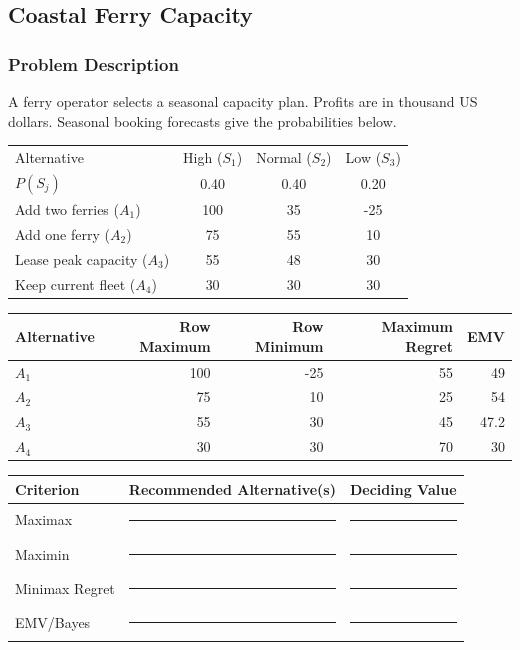\subsection{Coastal Ferry Capacity}\label{sec:c8-ferry}
\subsubsection*{Problem Description}
A ferry operator selects a seasonal capacity plan. Profits are in thousand US dollars. Seasonal booking forecasts give the probabilities below.
\begin{center}
\begin{tabular}{lccc}\toprule
Alternative & High ($S_1$) & Normal ($S_2$) & Low ($S_3$)\\
$P(S_j)$ & 0.40 & 0.40 & 0.20\\\midrule
Add two ferries ($A_1$) & 100 & 35 & -25\\
Add one ferry ($A_2$) & 75 & 55 & 10\\
Lease peak capacity ($A_3$) & 55 & 48 & 30\\
Keep current fleet ($A_4$) & 30 & 30 & 30\\\bottomrule
\end{tabular}
\end{center}
\begin{center}
\begin{tabular}{lrrrr}\toprule
Alternative & Row Maximum & Row Minimum & Maximum Regret & EMV\\\midrule
$A_1$ & 100 & -25 & 55 & 49\\
$A_2$ & 75 & 10 & 25 & 54\\
$A_3$ & 55 & 30 & 45 & 47.2\\
$A_4$ & 30 & 30 & 70 & 30\\\bottomrule
\end{tabular}
\end{center}

\begin{center}
\begin{tabular}{lll}\toprule
Criterion & Recommended Alternative(s) & Deciding Value\\\midrule
Maximax & \rule{3cm}{0.4pt} & \rule{2cm}{0.4pt}\\
Maximin & \rule{3cm}{0.4pt} & \rule{2cm}{0.4pt}\\
Minimax Regret & \rule{3cm}{0.4pt} & \rule{2cm}{0.4pt}\\
EMV/Bayes & \rule{3cm}{0.4pt} & \rule{2cm}{0.4pt}\\\bottomrule
\end{tabular}
\end{center}

